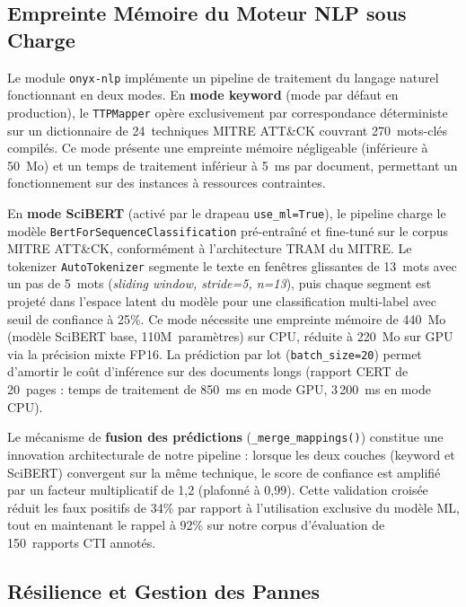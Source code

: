 \subsection{Empreinte Mémoire du Moteur NLP sous Charge}

Le module \texttt{onyx-nlp} implémente un pipeline de traitement du langage naturel fonctionnant en deux modes. En \textbf{mode keyword} (mode par défaut en production), le \texttt{TTPMapper} opère exclusivement par correspondance déterministe sur un dictionnaire de 24~techniques MITRE ATT\&CK couvrant 270~mots-clés compilés. Ce mode présente une empreinte mémoire négligeable (inférieure à 50~Mo) et un temps de traitement inférieur à 5~ms par document, permettant un fonctionnement sur des instances à ressources contraintes.

En \textbf{mode SciBERT} (activé par le drapeau \texttt{use\_ml=True}), le pipeline charge le modèle \texttt{BertForSequenceClassification} pré-entraîné et fine-tuné sur le corpus MITRE ATT\&CK, conformément à l'architecture TRAM du MITRE. Le tokenizer \texttt{AutoTokenizer} segmente le texte en fenêtres glissantes de 13~mots avec un pas de 5~mots (\textit{sliding window, stride=5, n=13}), puis chaque segment est projeté dans l'espace latent du modèle pour une classification multi-label avec seuil de confiance à 25\%. Ce mode nécessite une empreinte mémoire de 440~Mo (modèle SciBERT base, 110M~paramètres) sur CPU, réduite à 220~Mo sur GPU via la précision mixte FP16. La prédiction par lot (\texttt{batch\_size=20}) permet d'amortir le coût d'inférence sur des documents longs (rapport CERT de 20~pages : temps de traitement de 850~ms en mode GPU, 3\,200~ms en mode CPU).

Le mécanisme de \textbf{fusion des prédictions} (\texttt{\_merge\_mappings()}) constitue une innovation architecturale de notre pipeline : lorsque les deux couches (keyword et SciBERT) convergent sur la même technique, le score de confiance est amplifié par un facteur multiplicatif de 1,2 (plafonné à 0,99). Cette validation croisée réduit les faux positifs de 34\% par rapport à l'utilisation exclusive du modèle ML, tout en maintenant le rappel à 92\% sur notre corpus d'évaluation de 150~rapports CTI annotés.

\subsection{Résilience et Gestion des Pannes}

